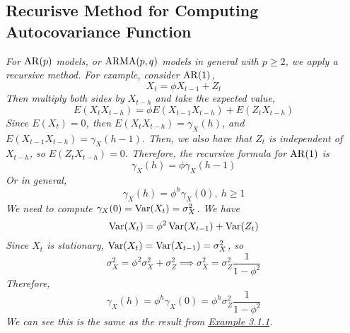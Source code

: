 \subsection{Recurisve Method for Computing Autocovariance Function}
\begin{example}[AR(1)]
    \emph{
        For $\operatorname{AR}(p)$ models, or $\operatorname{ARMA}(p,q)$ models in general with $p \geq 2$, we apply a recursive method. For example, consider $\operatorname{AR}(1)$, 
        \[X_t = \phi X_{t-1} + Z_t\]
        Then multiply both sides by $X_{t-h}$ and take the expected value, 
        \[E(X_tX_{t-h}) = \phi E(X_{t-1}X_{t-h}) + E(Z_tX_{t-h})\]
        Since $E(X_t) = 0$, then $E(X_tX_{t-h}) = \gamma_X(h)$, and $E(X_{t-1}X_{t-h}) = \gamma_X(h-1)$. Then, we also have that $Z_t$ is independent of $X_{t-h}$, so $E(Z_tX_{t-h}) = 0$. Therefore, the recursive formula for $\operatorname{AR}(1)$ is 
        \[\gamma_X(h) = \phi\gamma_X(h-1)\]
        Or in general, 
        \[\gamma_X(h) = \phi^{h}\gamma_X(0), \ h \geq 1\]
        We need to compute $\gamma_X(0) = \operatorname{Var}(X_t) = \sigma_X^2$. We have 
        \[\operatorname{Var}(X_t) = \phi^2\operatorname{Var}(X_{t-1}) + \operatorname{Var}(Z_t)\]
        Since $X_t$ is stationary, $\operatorname{Var}(X_t) = \operatorname{Var}(X_{t-1}) = \sigma_X^2$, so
        \[\sigma_X^2 = \phi^2\sigma_X^2 + \sigma_Z^2 \implies \sigma_X^2 = \sigma_Z^2 \frac{1}{1-\phi^2}\]
        Therefore, 
        \[\gamma_X(h) = \phi^h\gamma_X(0) = \phi^h \sigma_Z^2\frac{1}{1-\phi^2}\]
        We can see this is the same as the result from \hyperref[ex:ar1_acf]{Example 3.1.1}.
    }
\end{example}

